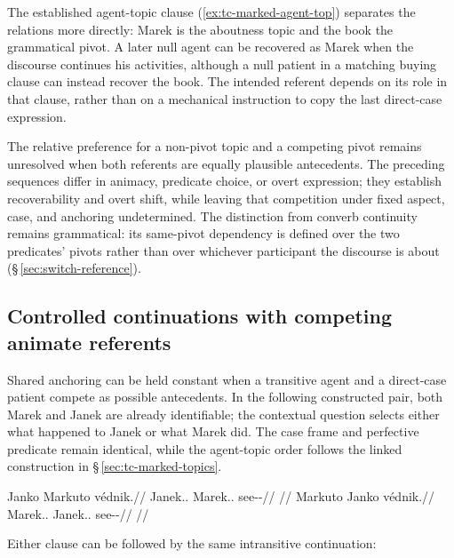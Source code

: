 The established agent-topic clause 
 (\ref{ex:tc-marked-agent-top}) separates the relations more directly:
 Marek is the aboutness topic and the book the grammatical pivot. A later null
 agent can be recovered as Marek when the discourse continues his activities,
 although a null patient in a matching buying clause can instead recover the
 book. The intended referent depends on its role in that clause, rather than
 on a mechanical instruction to copy the last direct-case expression.

The relative preference for a non-pivot topic and a competing pivot remains
 unresolved when both referents are equally plausible antecedents. The
 preceding sequences differ in animacy, predicate choice, or overt expression;
 they establish recoverability and overt shift, while leaving that competition
 under fixed aspect, case, and anchoring undetermined. The distinction from converb continuity
 remains grammatical: its same-pivot dependency is defined over the two
 predicates' pivots rather than over whichever participant the discourse is
 about (§\,\ref{sec:switch-reference}).

\subsection{Controlled continuations with competing animate referents}
\label{sec:disc-controlled-continuations}

Shared anchoring can be held constant when a transitive agent and a
 direct-case patient compete as possible antecedents. In the following
 constructed pair, both Marek and Janek are already identifiable; the
 contextual question selects either what happened to Janek or what Marek did.
 The case frame and perfective predicate remain identical, while the
 agent-topic order follows the linked construction in
 §\,\ref{sec:tc-marked-topics}.

\pex\label{ex:disc-animate-competition}
\a\label{ex:disc-patient-centre}%
\begingl
\gla Janko Markuto védnik.//
\glb Janek.\Dir{}.\Def{} Marek.\Trs{}.\Def{} see-\Trs{}-\Pf{}//
\glft {}
 //
\endgl
\a\label{ex:disc-agent-centre}%
\begingl
\gla Markuto Janko védnik.//
\glb Marek.\Trs{}.\Def{} Janek.\Dir{}.\Def{} see-\Trs{}-\Pf{}//
\glft {}
 //
\endgl
\xe

\noindent Either clause can be followed by the same intransitive continuation:

